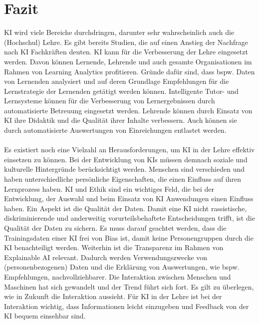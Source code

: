 \chapter{Fazit}
KI wird viele Bereiche durchdringen, darunter sehr wahrscheinlich auch die (Hochschul) Lehre.
Es gibt bereits Studien, die auf einen Anstieg der Nachfrage nach KI Fachkräften deuten. %
KI kann für die Verbesserung der Lehre eingesetzt werden. Davon können Lernende, Lehrende und auch gesamte Organisationen im Rahmen von Learning Analytics profitieren.
Gründe dafür sind, dass bspw. Daten von Lernenden analysiert und auf deren Grundlage Empfehlungen für die Lernstrategie der Lernenden getätigt werden können. %
Intelligente Tutor- und Lernsysteme können für die Verbesserung von Lernergebnissen durch automatisierte Betreuung eingesetzt werden. %
Lehrende können durch Einsatz von KI ihre Didaktik und die Qualität ihrer Inhalte verbessern.
Auch können sie durch automatisierte Auswertungen von Einreichungen entlastet werden. %
\\
\\ \noindent
Es existiert noch eine Vielzahl an Herausforderungen, um KI in der Lehre effektiv einsetzen zu können.
Bei der Entwicklung von KIs müssen demnach soziale und kulturelle Hintergründe berücksichtigt werden.
Menschen sind verschieden und haben unterschiedliche persönliche Eigenschaften, die einen Einfluss auf ihren Lernprozess haben.
KI und Ethik sind ein wichtiges Feld, die bei der Entwicklung, der Auswahl und beim Einsatz von KI Anwendungen einen Einfluss haben.
Ein Aspekt ist die Qualität der Daten. Damit eine KI nicht rassistische, diskriminierende und anderweitig vorurteilsbehaftete Entscheidungen trifft, ist die Qualität der Daten zu sichern.
Es muss darauf geachtet werden, dass die Trainingsdaten einer KI frei von Bias ist, damit keine Personengruppen durch die KI benachteiligt werden. %
Weiterhin ist die Transparenz im Rahmen von Explainable AI relevant. Dadurch werden Verwendungszwecke von (personenbezogenen) Daten und die Erklärung von Auswertungen, wie bspw. Empfehlungen, nachvollziehbarer. %
Die Interaktion zwischen Menschen und Maschinen hat sich gewandelt und der Trend führt sich fort. Es gilt zu überlegen, wie in Zukunft die Interaktion aussieht.
Für KI in der Lehre ist bei der Interaktion wichtig, dass Informationen leicht einzugeben und Feedback von der KI bequem einsehbar sind. %
